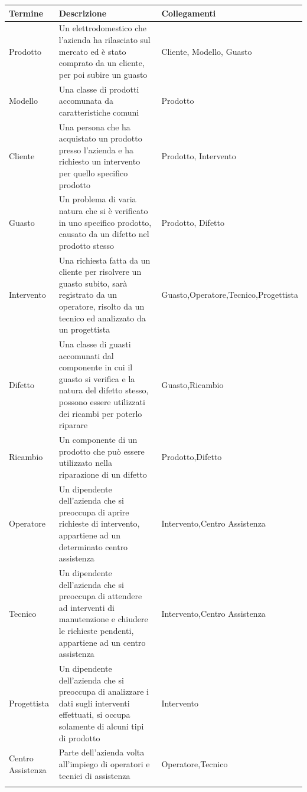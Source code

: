 \documentclass[a4paper, 12pt]{report}
\begin{document}
\begin{tabularx}{\linewidth}{>{\hsize=0.375\hsize}X|X|>{\hsize=0.475\hsize}X}
	\hline
	\textbf{Termine} & \textbf{Descrizione} & \textbf{Collegamenti}\\
	\hline
	\hline
	Prodotto & Un elettrodomestico che l'azienda ha rilasciato sul mercato ed è stato comprato da un cliente, per poi subire un guasto &
	Cliente,\newline
	Modello,\newline
	Guasto\\
	\hline
	Modello & Una classe di prodotti accomunata da caratteristiche comuni & Prodotto\\
	\hline
	Cliente & Una persona che ha acquistato un prodotto presso l'azienda e ha richiesto un intervento per quello specifico prodotto & Prodotto,\newline 
	Intervento\\
	\hline
	Guasto & Un problema di varia natura che si è verificato in uno specifico prodotto, causato da un difetto nel prodotto stesso & Prodotto,\newline 
	Difetto\\
	\hline
	Intervento & Una richiesta fatta da un cliente per risolvere un guasto subito, sarà registrato da un operatore, risolto da un tecnico ed
	analizzato da un progettista & Guasto,\newline Operatore,\newline Tecnico,\newline Progettista\\
	\hline
	Difetto & Una classe di guasti accomunati dal componente in cui il guasto si verifica e la natura del difetto stesso, possono essere utilizzati
	dei ricambi per poterlo riparare & Guasto,\newline Ricambio\\
	\hline
	Ricambio & Un componente di un prodotto che può essere utilizzato nella riparazione di un difetto & Prodotto,\newline Difetto\\
	\hline
	Operatore & Un dipendente dell'azienda che si preoccupa di aprire richieste di intervento, appartiene ad un determinato centro assistenza
	& Intervento,\newline Centro Assistenza\\
	\hline
	Tecnico & Un dipendente dell'azienda che si preoccupa di attendere ad interventi di manutenzione e chiudere le richieste pendenti, appartiene
	ad un centro assistenza & Intervento,\newline Centro Assistenza\\
	\hline
	Progettista & Un dipendente dell'azienda che si preoccupa di analizzare i dati sugli interventi effettuati, si occupa solamente di alcuni tipi
	di prodotto & Intervento\\
	\hline
	Centro Assistenza & Parte dell'azienda volta all'impiego di operatori e tecnici di assistenza & Operatore,\newline Tecnico\\
	\hline
	\caption{Glossario dei termini}
\end{tabularx}
\end{document}
